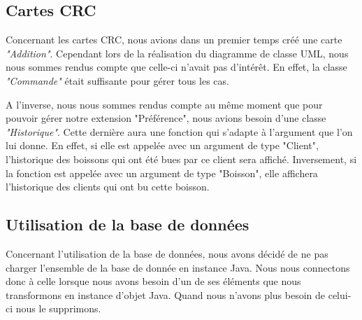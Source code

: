 \documentclass[11pt, a4, oneside, headings=normal]{scrreprt}
\begin{document}
\subsection*{Cartes CRC}

Concernant les cartes CRC, nous avions dans un premier temps créé une carte \textit{"Addition"}. Cependant lors de la réalisation du diagramme de classe UML, nous nous sommes rendus compte que celle-ci n'avait pas d'intérêt. En effet, la classe \textit{"Commande"} était suffisante pour gérer tous les cas.

A l'inverse, nous nous sommes rendus compte au même moment que pour pouvoir gérer notre extension "Préférence", nous avions besoin d'une classe \textit{"Historique"}. Cette dernière aura une fonction qui s'adapte à l'argument que l'on lui donne. En effet, si elle est appelée avec un argument de type "Client", l'historique des boissons qui ont été bues par ce client sera affiché. Inversement, si la fonction est appelée avec un argument de type "Boisson", elle affichera l'historique des clients qui ont bu cette boisson.

\subsection*{Utilisation de la base de données}

Concernant l'utilisation de la base de données, nous avons décidé de ne pas charger l'ensemble de la base de donnée en instance Java. Nous nous connectons donc à celle lorsque nous avons besoin d'un de ses éléments que nous transformons en instance d'objet Java. Quand nous n'avons plus besoin de celui-ci nous le supprimons.
\end{document}
